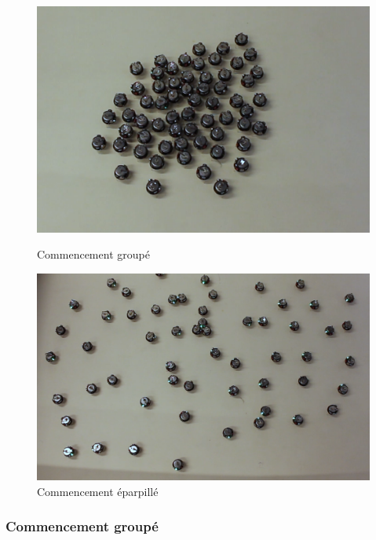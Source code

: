 \documentclass[a4paper]{article}
\begin{document}
\begin{figure}[h]
	\begin{minipage}[c]{.46\linewidth}
		\centering
		\includegraphics[width=1.1\linewidth]{../../script_results/start_groupe_real.png}
		\caption{Commencement groupé}
	\end{minipage}
	\hfill%
	\begin{minipage}[c]{.46\linewidth}
		\centering
		\includegraphics[width=1.1\linewidth]{../../script_results/start_eparpille_real.png}
		\caption{Commencement éparpillé}
	\end{minipage}
\end{figure}



\subsubsection{Commencement groupé}
\end{document}
